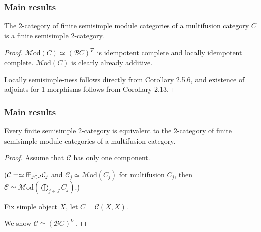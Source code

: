\documentclass{beamer}
\DeclareMathOperator{\id}{id}
\newcommand{\cB}{{\mathcal{B}}}
\newcommand{\cC}{{\mathcal{C}}}
\newcommand{\bigboxplus}{\Huge \boxplus}
\newcommand{\Mod}{{\mathcal{M}\textrm{od}}}
\newcommand{\ModA}[1]{{\Mod(#1)}}
\begin{document}
\begin{frame}
\frametitle{Main results}

\begin{theorem}
The 2-category of finite semisimple module categories
of a multifusion category $C$
is a finite semisimple 2-category.
\end{theorem}

\pause

\begin{proof}
$\ModA{C} \simeq (\cB C)^\nabla$ is idempotent complete
and locally idempotent complete.
$\ModA{C}$ is clearly already additive.


Locally semisimple-ness follows directly from
\cite{DSPSb}{Corollary 2.5.6},
and existence of adjoints for 1-morphisms
follows from \cite{DSPSa}{Corollary 2.13}.

\end{proof}

\end{frame}


\begin{frame}
\frametitle{Main results}

\begin{theorem}
Every finite semisimple 2-category is equivalent to
the 2-category of finite semisimple module categories
of a multifusion category.
\end{theorem}

\begin{proof}\renewcommand{\qedsymbol}{}
Assume that $\cC$ has only one component.

\pause
($\cC =\simeq \bigboxplus_{j \in J} \cC_j$
and $\cC_j \simeq \ModA{C_j}$ for multifusion $C_j$,
then $\cC \simeq \ModA{\bigoplus_{j \in J} C_j}$.)

\pause
Fix simple object $X$, let $C = \cC(X,X)$.
\pause

We show $\cC \simeq (\cB C)^\nabla$.

\end{proof}

\end{frame}
\end{document}
